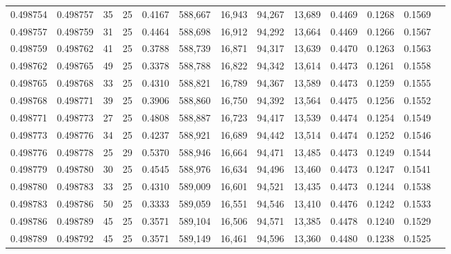 \begin{tabular}{rrrrrrrrrrrrr}
0.498754 & 0.498757 &    35 &  25 &                                     0.4167 & 588,667 &  16,943 &  94,267 &  13,689 & 0.4469 & 0.1268 & 0.1569 \\
0.498757 & 0.498759 &    31 &  25 &                                     0.4464 & 588,698 &  16,912 &  94,292 &  13,664 & 0.4469 & 0.1266 & 0.1567 \\
0.498759 & 0.498762 &    41 &  25 &                                     0.3788 & 588,739 &  16,871 &  94,317 &  13,639 & 0.4470 & 0.1263 & 0.1563 \\
0.498762 & 0.498765 &    49 &  25 &                                     0.3378 & 588,788 &  16,822 &  94,342 &  13,614 & 0.4473 & 0.1261 & 0.1558 \\
0.498765 & 0.498768 &    33 &  25 &                                     0.4310 & 588,821 &  16,789 &  94,367 &  13,589 & 0.4473 & 0.1259 & 0.1555 \\
0.498768 & 0.498771 &    39 &  25 &                                     0.3906 & 588,860 &  16,750 &  94,392 &  13,564 & 0.4475 & 0.1256 & 0.1552 \\
0.498771 & 0.498773 &    27 &  25 &                                     0.4808 & 588,887 &  16,723 &  94,417 &  13,539 & 0.4474 & 0.1254 & 0.1549 \\
0.498773 & 0.498776 &    34 &  25 &                                     0.4237 & 588,921 &  16,689 &  94,442 &  13,514 & 0.4474 & 0.1252 & 0.1546 \\
0.498776 & 0.498778 &    25 &  29 &                                     0.5370 & 588,946 &  16,664 &  94,471 &  13,485 & 0.4473 & 0.1249 & 0.1544 \\
0.498779 & 0.498780 &    30 &  25 &                                     0.4545 & 588,976 &  16,634 &  94,496 &  13,460 & 0.4473 & 0.1247 & 0.1541 \\
0.498780 & 0.498783 &    33 &  25 &                                     0.4310 & 589,009 &  16,601 &  94,521 &  13,435 & 0.4473 & 0.1244 & 0.1538 \\
0.498783 & 0.498786 &    50 &  25 &                                     0.3333 & 589,059 &  16,551 &  94,546 &  13,410 & 0.4476 & 0.1242 & 0.1533 \\
0.498786 & 0.498789 &    45 &  25 &                                     0.3571 & 589,104 &  16,506 &  94,571 &  13,385 & 0.4478 & 0.1240 & 0.1529 \\
0.498789 & 0.498792 &    45 &  25 &                                     0.3571 & 589,149 &  16,461 &  94,596 &  13,360 & 0.4480 & 0.1238 & 0.1525 \\

\end{tabular}
